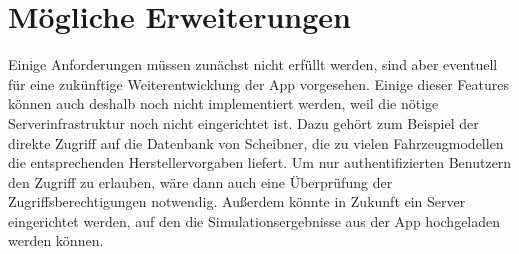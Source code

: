 	\section{Mögliche Erweiterungen}
	\label{sec:moegliche-erw}
	
	Einige Anforderungen müssen zunächst nicht erfüllt werden, sind aber eventuell für eine zukünftige Weiterentwicklung der App vorgesehen. Einige dieser Features können auch deshalb noch nicht implementiert werden, weil die nötige Serverinfrastruktur noch nicht eingerichtet ist.
	Dazu gehört zum Beispiel der direkte Zugriff auf die Datenbank von Scheibner, die zu vielen Fahrzeugmodellen die entsprechenden Herstellervorgaben liefert. Um nur authentifizierten Benutzern den Zugriff zu erlauben, wäre dann auch eine Überprüfung der Zugriffsberechtigungen notwendig.
	Außerdem könnte in Zukunft ein Server eingerichtet werden, auf den die Simulationsergebnisse aus der App hochgeladen werden können.